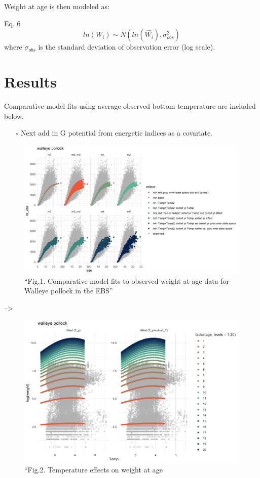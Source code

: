 \documentclass[
]{article}
\providecommand{\tightlist}{%
  \setlength{\itemsep}{0pt}\setlength{\parskip}{0pt}}
\begin{document}
Weight at age is then modeled as:

Eq. 6 \[ ln({W}_i) \sim N(ln(\hat{W}_i),\sigma^2_{obs})\] where
\(\sigma_{obs}\) is the standard deviation of observation error (log
scale).

\section{Results}\label{results}

Comparative model fits using average observed bottom temperature are
included below.

\begin{itemize}
\tightlist
\item[$\square$]
  Next add in G potential from energetic indices as a covariate.
\end{itemize}

\begin{figure}
\centering
\includegraphics{Figs/model_plots.jpg}
\caption{``Fig.1. Comparative model fits to observed weight at age data
for Walleye pollock in the EBS''}
\end{figure}

--\textgreater{}

\begin{figure}
\centering
\includegraphics{Figs/model_Temp_byage2.jpg}
\caption{``Fig.2. Temperature effects on weight at age}
\end{figure}
\end{document}
